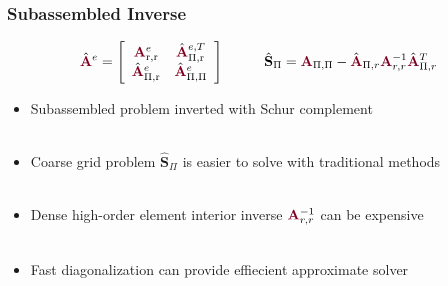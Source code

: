 \documentclass{beamer}
\begin{document}

\begin{frame}
\begin{center}
\frametitle{Subassembled Inverse}

\begin{equation}
\hat{\color{burgundy}\mathbf{A}}^e =
\left[ \begin{array}{c c}
{\color{burgundy}\mathbf{A}}_{\text{r}, \text{r}}^e  &  \hat{\color{burgundy}\mathbf{A}}_{\Pi, \text{r}}^{e, T}  \\
\hat{\color{burgundy}\mathbf{A}}_{\Pi, \text{r}}^e   &  \hat{\color{burgundy}\mathbf{A}}_{\Pi, \Pi}^e            \\
\end{array} \right] \hspace{10mm}
\hat{\mathbf{S}}_\Pi = {\color{burgundy}\mathbf{A}}_{\Pi, \Pi} - \hat{\color{burgundy}\mathbf{A}}_{\Pi, r} {\color{burgundy}\mathbf{A}}_{r, r}^{-1} \hat{\color{burgundy}\mathbf{A}}_{\Pi, r}^T
\label{eq:subassembledschur}
\end{equation}

\begin{itemize}

\item Subassembled problem inverted with Schur complement\\

~\\

\item Coarse grid problem $\hat{\mathbf{S}}_\Pi$ is easier to solve with traditional methods\\

~\\

\item Dense high-order element interior inverse ${\color{burgundy}\mathbf{A}}_{r, r}^{-1}$ can be expensive\\

~\\

\item Fast diagonalization can provide effiecient approximate solver\\

\end{itemize}

\end{center}
\end{frame}
\end{document}
